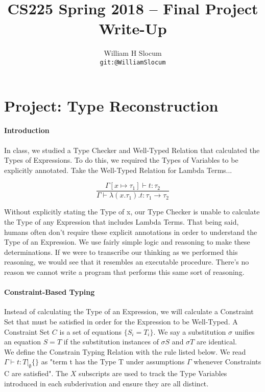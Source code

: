 \documentclass{article}
\title{CS225 Spring 2018 -- Final Project Write-Up}
\author{
  William H Slocum \\ \small{\texttt{git:@WilliamSlocum}}
}
\begin{document}
\maketitle

\section*{Project: Type Reconstruction}

\paragraph{Introduction}
In class, we studied a Type Checker and Well-Typed Relation that calculated the Types of Expressions. To do this, we required the Types of Variables to be explicitly annotated. Take the Well-Typed Relation for Lambda Terms...

\begin{equation*}
    \frac{\Gamma[x \mapsto \tau_{1}] \vdash t : \tau_{2}}
    {\Gamma \vdash \lambda(x.\tau_{1}).t : \tau_{1} \to \tau_{2}}
\end{equation*}

Without explicitly stating the Type of x, our Type Checker is unable to calculate the Type of any Expression that includes Lambda Terms. That being said, humans often don't require these explicit annotations in order to understand the Type of an Expression. We use fairly simple logic and reasoning to make these determinations. If we were to transcribe our thinking as we performed this reasoning, we would see that it resembles an executable procedure. There's no reason we cannot write a program that performs this same sort of reasoning. 

\paragraph{Constraint-Based Typing}
Instead of calculating the Type of an Expression, we will calculate a Constraint Set that must be satisfied in order for the Expression to be Well-Typed. A Constraint Set $C$ is a set of equations $\{S_{i} = T_{i}\}$. We say a substitution $\sigma$ unifies an equation $S = T$ if the substitution instances of $\sigma S$ and $\sigma T$ are identical. \\

We define the Constrain Typing Relation with the rule listed below. We read $\Gamma \vdash t : T |_{\emptyset} \{\}$ as "term t has the Type T under assumptions $\Gamma$ whenever Constraints C are satisfied". The $X$ subscripts are used to track the Type Variables introduced in each subderivation and ensure they are all distinct.
\end{document}
